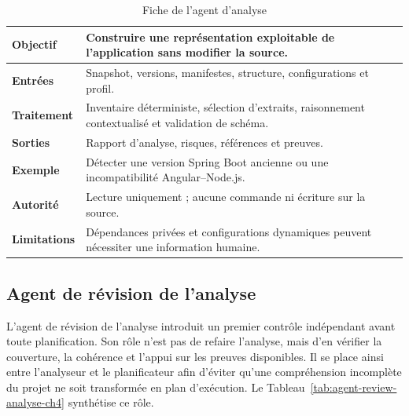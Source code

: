 \begin{table}[H]
    \centering
    \caption{Fiche de l'agent d'analyse}
    \label{tab:agent-analyse-ch4}
    \small
    \begin{tabularx}{\textwidth}{|>{\bfseries\RaggedRight\arraybackslash}p{3.1cm}|>{\RaggedRight\arraybackslash}X|}
        \hline
        Objectif & Construire une représentation exploitable de l'application sans modifier la source. \\
        \hline
        Entrées & Snapshot, versions, manifestes, structure, configurations et profil. \\
        \hline
        Traitement & Inventaire déterministe, sélection d'extraits, raisonnement contextualisé et validation de schéma. \\
        \hline
        Sorties & Rapport d'analyse, risques, références et preuves. \\
        \hline
        Exemple & Détecter une version Spring Boot ancienne ou une incompatibilité Angular--Node.js. \\
        \hline
        Autorité & Lecture uniquement ; aucune commande ni écriture sur la source. \\
        \hline
        Limitations & Dépendances privées et configurations dynamiques peuvent nécessiter une information humaine. \\
        \hline
    \end{tabularx}
\end{table}

\subsection{Agent de révision de l'analyse}

L'agent de révision de l'analyse introduit un premier contrôle indépendant avant toute planification. Son rôle n'est pas de refaire l'analyse, mais d'en vérifier la couverture, la cohérence et l'appui sur les preuves disponibles. Il se place ainsi entre l'analyseur et le planificateur afin d'éviter qu'une compréhension incomplète du projet ne soit transformée en plan d'exécution. Le Tableau~\ref{tab:agent-review-analyse-ch4} synthétise ce rôle.

